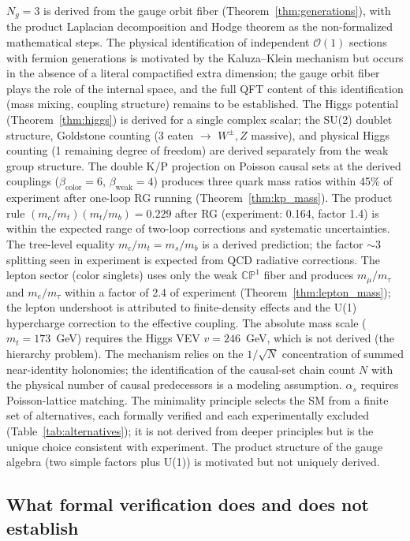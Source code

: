 \documentclass[12pt,a4paper]{article}
\begin{document}
$N_g = 3$ is derived from the gauge orbit fiber (Theorem~\ref{thm:generations}), with the product Laplacian decomposition and Hodge theorem as the non-formalized mathematical steps. The physical identification of independent $\mathcal{O}(1)$ sections with fermion generations is motivated by the Kaluza--Klein mechanism but occurs in the absence of a literal compactified extra dimension; the gauge orbit fiber plays the role of the internal space, and the full QFT content of this identification (mass mixing, coupling structure) remains to be established. The Higgs potential (Theorem~\ref{thm:higgs}) is derived for a single complex scalar; the SU(2) doublet structure, Goldstone counting (3 eaten $\to$ $W^\pm, Z$ massive), and physical Higgs counting (1 remaining degree of freedom) are derived separately from the weak group structure. The double K/P projection on Poisson causal sets at the derived couplings ($\beta_{\mathrm{color}} = 6$, $\beta_{\mathrm{weak}} = 4$) produces three quark mass ratios within 45\% of experiment after one-loop RG running (Theorem~\ref{thm:kp_mass}).  The product rule $(m_c/m_t)(m_t/m_b) = 0.229$ after RG (experiment: 0.164, factor 1.4) is within the expected range of two-loop corrections and systematic uncertainties.  The tree-level equality $m_c/m_t = m_s/m_b$ is a derived prediction; the factor $\sim$3 splitting seen in experiment is expected from QCD radiative corrections. The lepton sector (color singlets) uses only the weak $\mathbb{CP}^1$ fiber and produces $m_\mu/m_\tau$ and $m_e/m_\tau$ within a factor of 2.4 of experiment (Theorem~\ref{thm:lepton_mass}); the lepton undershoot is attributed to finite-density effects and the U(1) hypercharge correction to the effective coupling. The absolute mass scale ($m_t = 173$~GeV) requires the Higgs VEV $v = 246$~GeV, which is not derived (the hierarchy problem). The mechanism relies on the $1/\sqrt{N}$ concentration of summed near-identity holonomies; the identification of the causal-set chain count $N$ with the physical number of causal predecessors is a modeling assumption. $\alpha_s$ requires Poisson-lattice matching. The minimality principle selects the SM from a finite set of alternatives, each formally verified and each experimentally excluded (Table~\ref{tab:alternatives}); it is not derived from deeper principles but is the unique choice consistent with experiment. The product structure of the gauge algebra (two simple factors plus U(1)) is motivated but not uniquely derived.

\subsection{What formal verification does and does not establish}
\end{document}
